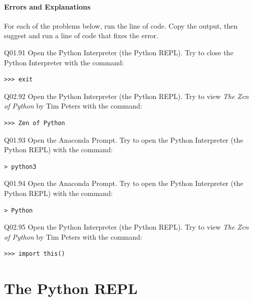 \documentclass{book}
\newenvironment{problems}{}{}  %
\begin{document}
    




    
        \subsubsection{Errors and Explanations}\label{errors-and-explanations}
    




    
        \begin{problems}
        For each of the problems below, run the line of code. Copy the output,
then suggest and run a line of code that fixes the error.

Q01.91 Open the Python Interpreter (the Python REPL). Try to close the
Python Interpreter with the command:

\begin{lstlisting}
>>> exit
\end{lstlisting}

Q02.92 Open the Python Interpreter (the Python REPL). Try to view
\emph{The Zen of Python} by Tim Peters with the command:

\begin{lstlisting}
>>> Zen of Python
\end{lstlisting}

Q01.93 Open the Anaconda Prompt. Try to open the Python Interpreter (the
Python REPL) with the command:

\begin{lstlisting}
> python3
\end{lstlisting}

Q01.94 Open the Anaconda Prompt. Try to open the Python Interpreter (the
Python REPL) with the command:

\begin{lstlisting}
> Python
\end{lstlisting}

Q02.95 Open the Python Interpreter (the Python REPL). Try to view
\emph{The Zen of Python} by Tim Peters with the command:

\begin{lstlisting}
>>> import this()
\end{lstlisting}
        \end{problems}

    




    
        \chapter{The Python REPL}\label{the-python-repl}
    
\end{document}
